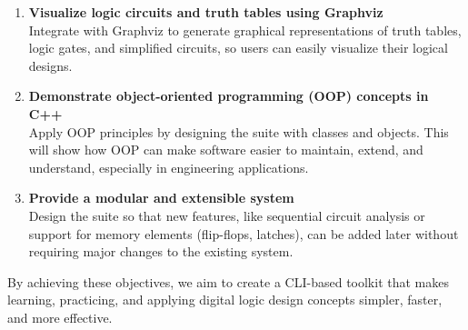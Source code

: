 \begin{enumerate}
  \item \textbf{Visualize logic circuits and truth tables using Graphviz} \\
        Integrate with Graphviz to generate graphical representations of truth tables, logic gates, and simplified circuits, so users can easily visualize their logical designs.

  \item \textbf{Demonstrate object-oriented programming (OOP) concepts in C++} \\
        Apply OOP principles by designing the suite with classes and objects. This will show how OOP can make software easier to maintain, extend, and understand, especially in engineering applications.

  \item \textbf{Provide a modular and extensible system} \\
        Design the suite so that new features, like sequential circuit analysis or support for memory elements (flip-flops, latches), can be added later without requiring major changes to the existing system.
\end{enumerate}

By achieving these objectives, we aim to create a CLI-based toolkit that makes learning, practicing, and applying digital logic design concepts simpler, faster, and more effective.
